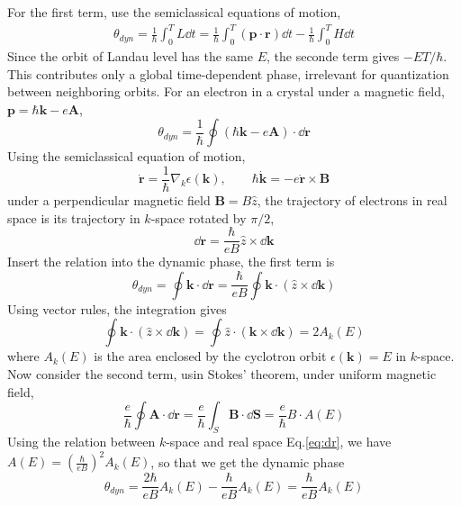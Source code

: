 \documentclass[12pt,a4paper]{article}
\begin{document}
    For the first term, use the semiclassical equations of motion,
    \[\begin{aligned}
        \theta_{dyn}
        = \frac{1}{\hbar} \int_0^T L \dd t
        = \frac{1}{\hbar} \int_0^T \left(\mathbf{p} \cdot \mathbf{r}\right) \dd t - \frac{1}{\hbar} \int_0^T H \dd t
    \end{aligned}\]
    Since the orbit of Landau level has the same $E$, the seconde term gives $−ET/\hbar$. This contributes only a global time-dependent phase, irrelevant for quantization between neighboring orbits. For an electron in a crystal under a magnetic field, $\mathbf{p} = \hbar \mathbf{k} - e\mathbf{A}$,
    \[
        \theta_{dyn}
        = \frac{1}{\hbar} \oint \left(\hbar \mathbf{k} - e\mathbf{A}\right) \cdot \dd \mathbf{r}
    \]
    Using the semiclassical equation of motion,
    \[
        \dot{\mathbf{r}} = \frac{1}{\hbar} \nabla_k \epsilon(\mathbf{k}), \qquad
        \hbar \dot{\mathbf{k}} = - e \dot{\mathbf{r}} \times \mathbf{B}
    \]
    under a perpendicular magnetic field $\mathbf{B} = B \hat{z}$, the trajectory of electrons in real space is its trajectory in $k$-space rotated by $\pi/2$,
    \begin{equation}
    \label{eq:dr}
        \dd \mathbf{r} = \frac{\hbar}{eB} \hat{z} \times \dd \mathbf{k}
    \end{equation}
    Insert the relation into the dynamic phase, the first term is
    \[
        \theta_{dyn}
        = \oint \mathbf{k} \cdot \dd \mathbf{r}
        = \frac{\hbar}{eB} \oint \mathbf{k} \cdot \left(\hat{z} \times \dd \mathbf{k}\right)
    \]
    Using vector rules, the integration gives
    \[
        \oint \mathbf{k} \cdot \left(\hat{z} \times \dd \mathbf{k}\right)
        = \oint \hat{z} \cdot \left(\mathbf{k} \times \dd \mathbf{k}\right)
        = 2 A_k(E)
    \]
    where $A_k(E)$ is the area enclosed by the cyclotron orbit $\epsilon(\mathbf{k}) = E$ in $k$-space. Now consider the second term, usin Stokes' theorem, under uniform magnetic field,
    \[
        \frac{e}{\hbar}\oint \mathbf{A}\cdot\dd\mathbf{r}
        = \frac{e}{\hbar}\int_S \mathbf{B}\cdot\dd\mathbf{S}
        = \frac{e}{\hbar} B \cdot A(E)
    \]
    Using the relation between $k$-space and real space Eq.\eqref{eq:dr}, we have $A(E) = \left(\frac{\hbar}{eB}\right)^2 A_k(E)$, so that we get the dynamic phase
    \begin{equation}
        \theta_{dyn} = \frac{2\hbar}{eB} A_k(E) - \frac{\hbar}{eB} A_k(E)
        = \frac{\hbar}{eB} A_k(E)
    \end{equation}
\end{document}
